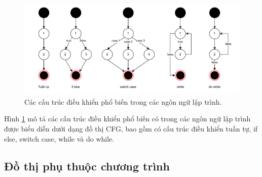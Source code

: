 \begin{figure}[H]
  \includegraphics[width=1\columnwidth] {figures/c2/c2_cfg_line.drawio.pdf}
  \centering
  \caption{Các cấu trúc điều khiển phổ biến trong các ngôn ngữ lập trình.}
  \label{img:c2_cfg_line}
\end{figure}

Hình \ref{img:c2_cfg_line} mô tả các cấu trúc điều khiển phổ biến có trong các ngôn ngữ lập trình được biểu diễn dưới dạng đồ thị CFG, bao gồm có cấu trúc điều khiển tuần tự, if else, switch case, while và do while.

\subsection{Đồ thị phụ thuộc chương trình}




